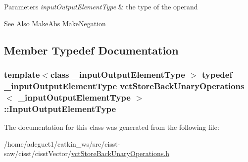 \begin{DoxyParams}{Parameters}
{\em input\-Output\-Element\-Type} & the type of the operand\\
\hline
\end{DoxyParams}
\begin{DoxySeeAlso}{See Also}
\hyperlink{classvct_store_back_unary_operations_1_1_make_abs}{Make\-Abs} \hyperlink{classvct_store_back_unary_operations_1_1_make_negation}{Make\-Negation} 
\end{DoxySeeAlso}


\subsection{Member Typedef Documentation}
\hypertarget{classvct_store_back_unary_operations_a8af17faaa73a8d090094d468eee32062}{
\subsubsection[{Input\-Output\-Element\-Type}]{\setlength{\rightskip}{0pt plus 5cm}template$<$class \-\_\-input\-Output\-Element\-Type $>$ typedef \-\_\-input\-Output\-Element\-Type {\bf vct\-Store\-Back\-Unary\-Operations}$<$ \-\_\-input\-Output\-Element\-Type $>$\-::{\bf Input\-Output\-Element\-Type}}}\label{classvct_store_back_unary_operations_a8af17faaa73a8d090094d468eee32062}


The documentation for this class was generated from the following file\-:\begin{DoxyCompactItemize}
\item 
/home/adeguet1/catkin\-\_\-ws/src/cisst-\/saw/cisst/cisst\-Vector/\hyperlink{vct_store_back_unary_operations_8h}{vct\-Store\-Back\-Unary\-Operations.\-h}\end{DoxyCompactItemize}
